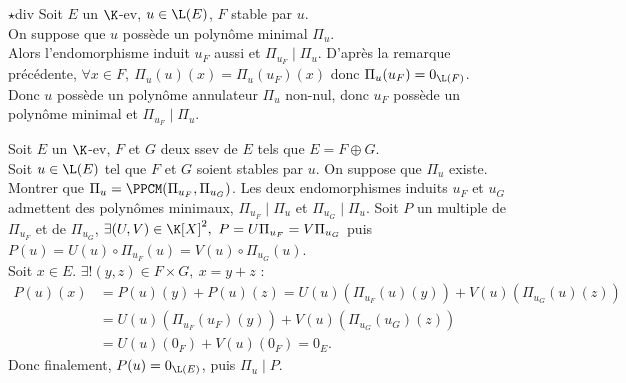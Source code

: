 \documentclass[11pt]{article}
\begin{document}
\begin{prop}{$\star$}{div}
    Soit $E$ un $\K$-ev, $u\in\L(E)$, $F$ stable par $u$.\\
    On suppose que $u$ possède un polynôme minimal $\Pi_u$.\\
    Alors l'endomorphisme induit $u_F$ aussi et $\Pi_{u_F} \mid \Pi_u$.
    \tcblower
    D'après la remarque précédente, $\forall x \in F, ~ \Pi_u(u)(x)=\Pi_u(u_F)(x)$ donc $\Pi_u(u_F)=0_{\L(F)}$.\\
    Donc $u$ possède un polynôme annulateur $\Pi_u$ non-nul, donc $u_F$ possède un polynôme minimal et $\Pi_{u_F}\mid \Pi_u$.
\end{prop}

\begin{exercice}{}{}
    Soit $E$ un $\K$-ev, $F$ et $G$ deux ssev de $E$ tels que $E=F\oplus G$.\\
    Soit $u\in\L(E)$ tel que $F$ et $G$ soient stables par $u$. On suppose que $\Pi_u$ existe.\\
    Montrer que $\Pi_u=\PPCM(\Pi_{u_F},\Pi_{u_G})$.
    \tcblower
    Les deux endomorphismes induits $u_F$ et $u_G$ admettent des polynômes minimaux, $\Pi_{u_F}\mid \Pi_u$ et $\Pi_{u_G} \mid \Pi_u$.
    Soit $P$ un multiple de $\Pi_{u_F}$ et de $\Pi_{u_G}$, $\exists (U,V) \in \K[X]^2, ~ P = U\Pi_{u_F} = V\Pi_{u_G}$ puis $P(u)=U(u)\circ \Pi_{u_F}(u)=V(u)\circ \Pi_{u_G}(u)$.\\
    Soit $x\in E$. $\exists!(y,z)\in F\times G, ~ x=y+z$ :
    \begin{align*}
        P(u)(x) &= P(u)(y) + P(u)(z) = U(u)\left( \Pi_{u_F}(u)(y) \right) + V(u)\left( \Pi_{u_G}(u)(z) \right)\\
        &= U(u)\left( \Pi_{u_F}(u_F)(y) \right) + V(u)\left( \Pi_{u_G}(u_G)(z) \right)\\
        &= U(u)(0_F) + V(u)(0_F) = 0_E.
    \end{align*}
    Donc finalement, $P(u)=0_{\L(E)}$, puis $\Pi_u\mid P$.
\end{exercice}

\pagebreak
\end{document}
